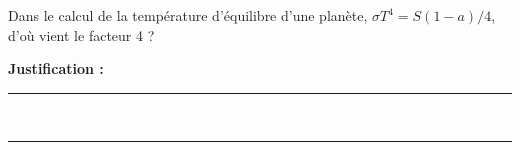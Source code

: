Dans le calcul de la température d'équilibre d'une planète, $\sigma T^4 = S(1-a)/4$, d'où vient le facteur 4 ?

\choices

\noindent\textbf{Justification :} \hrulefill \\[2.5ex]
\rule{\linewidth}{0.4pt} \\[2.5ex]
\rule{\linewidth}{0.4pt}
\vfill
